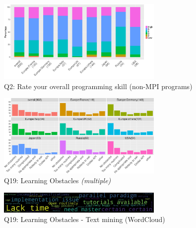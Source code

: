 \documentclass[preprint,5p,times]{elsarticle}
\begin{document}
\begin{figure}[tb]
\begin{center}
\includegraphics[width=8.0cm]{Figs/Q2.pdf}
\caption{Q2: Rate your overall programming skill (non-MPI
  programs)}
\label{fig:prog-skill}
\end{center}
\end{figure}

\begin{figure}[tb]
\begin{center}
\includegraphics[width=8.0cm]{R-scripts/Q19.pdf}
\caption{Q19: Learning Obstacles {\it(multiple)}}
\label{fig:learning-obstacles}
\end{center}
\end{figure}

\begin{figure}[tb]
\begin{center}
\includegraphics[width=8.0cm]{Figs/Q19-others.pdf}
\caption{Q19: Learning Obstacles - Text mining (WordCloud)}
\label{fig:learning-obstacles-wc}
\end{center}
\end{figure}
\end{document}
